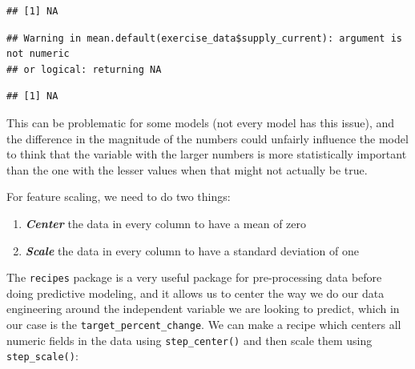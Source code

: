 \documentclass[
]{book}
\newenvironment{Shaded}{\begin{snugshade}}{\end{snugshade}}
\newcommand{\DataTypeTok}[1]{\textcolor[rgb]{0.13,0.29,0.53}{#1}}
\newcommand{\KeywordTok}[1]{\textcolor[rgb]{0.13,0.29,0.53}{\textbf{#1}}}
\newcommand{\NormalTok}[1]{#1}
\newcommand{\OperatorTok}[1]{\textcolor[rgb]{0.81,0.36,0.00}{\textbf{#1}}}
\newcommand{\StringTok}[1]{\textcolor[rgb]{0.31,0.60,0.02}{#1}}
\begin{document}
\begin{verbatim}
## [1] NA
\end{verbatim}

\begin{Shaded}
\end{Shaded}

\begin{verbatim}
## Warning in mean.default(exercise_data$supply_current): argument is not numeric
## or logical: returning NA
\end{verbatim}

\begin{verbatim}
## [1] NA
\end{verbatim}

This can be problematic for some models (not every model has this issue), and the difference in the magnitude of the numbers could unfairly influence the model to think that the variable with the larger numbers is more statistically important than the one with the lesser values when that might not actually be true.

For feature scaling, we need to do two things:

\begin{enumerate}
\def\labelenumi{\arabic{enumi}.}
\item
  \textbf{\emph{Center}} the data in every column to have a mean of zero
\item
  \textbf{\emph{Scale}} the data in every column to have a standard deviation of one
\end{enumerate}

The \texttt{recipes} \citep{R-recipes} package is a very useful package for pre-processing data before doing predictive modeling, and it allows us to center the way we do our data engineering around the independent variable we are looking to predict, which in our case is the \texttt{target\_percent\_change}. We can make a recipe which centers all numeric fields in the data using \texttt{step\_center()} and then scale them using \texttt{step\_scale()}:

\begin{Shaded}
\end{Shaded}
\end{document}
